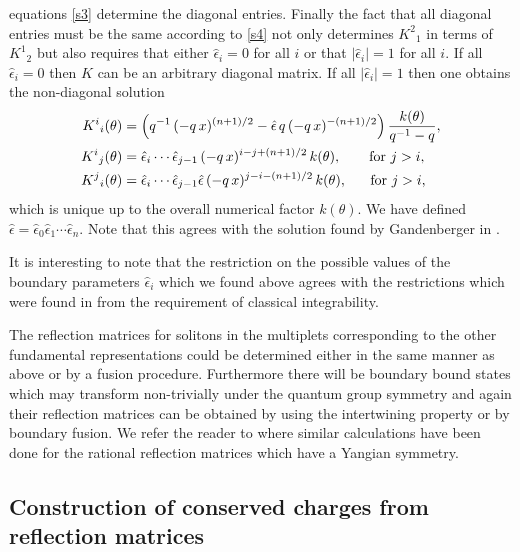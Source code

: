 \documentclass[a4paper,12pt]{article}
\numberwithin{equation}{section}
\begin{document}
equations \eqref{s3} determine the diagonal entries. Finally the
fact that all diagonal entries must be the same according to
\eqref{s4} not only determines $K^2{}_1$ in terms of $K^1{}_2$ but
also requires that either $\hat{\epsilon}_i=0$ for all $i$ or that
$|\hat{\epsilon}_i|=1$ for all $i$. If all $\hat{\epsilon}_i=0$
then $K$ can be an arbitrary diagonal matrix. If all
$|\hat{\epsilon}_i|=1$ then one obtains the non-diagonal solution
\begin{align}\label{k}
  K^i{}_i(\theta)&=\left(
  q^{-1}\,(-q\,x)^{(n+1)/2}-
  \hat{\epsilon}\,q\,(-q\,x)^{-(n+1)/2}
  \right)
  \frac{k(\theta)}{q^{-1}-q},\notag\\
  K^i{}_j(\theta)&=\hat{\epsilon}_i\cdots\hat{\epsilon}_{j-1}\,
  (-q\,x)^{i-j+(n+1)/2}\,k(\theta),~~~~~~\text{for }j>i,\\
  K^j{}_i(\theta)&=\hat{\epsilon}_i\cdots\hat{\epsilon}_{j-1}\hat{\epsilon}\,
  (-q\,x)^{j-i-(n+1)/2}\,k(\theta),~~~~~\text{for }j>i,\notag
\end{align}
which is unique up to the overall numerical factor $k(\theta)$. We
have defined
$\hat{\epsilon}=\hat{\epsilon}_0\hat{\epsilon}_1\cdots\hat{\epsilon}_n$.
Note that this agrees with the solution found by Gandenberger in
\cite{Gan99b}.

It is interesting to note that the restriction on the possible
values of the boundary parameters $\hat{\epsilon}_i$ which we
found above agrees with the restrictions which were found in
\cite{Bow95} from the requirement of classical integrability.

The reflection matrices for solitons in the multiplets
corresponding to the other fundamental representations could be
determined either in the same manner as above or by a fusion
procedure. Furthermore there will be boundary bound states which
may  transform non-trivially under the quantum group symmetry and
again their reflection matrices can be obtained by using the
intertwining property or by boundary fusion. We refer the reader
to \cite{Del01} where similar calculations have been done for the
rational reflection matrices which have a Yangian symmetry.





\subsection{Construction of conserved charges from reflection
matrices\label{sectccrm}}
\end{document}
